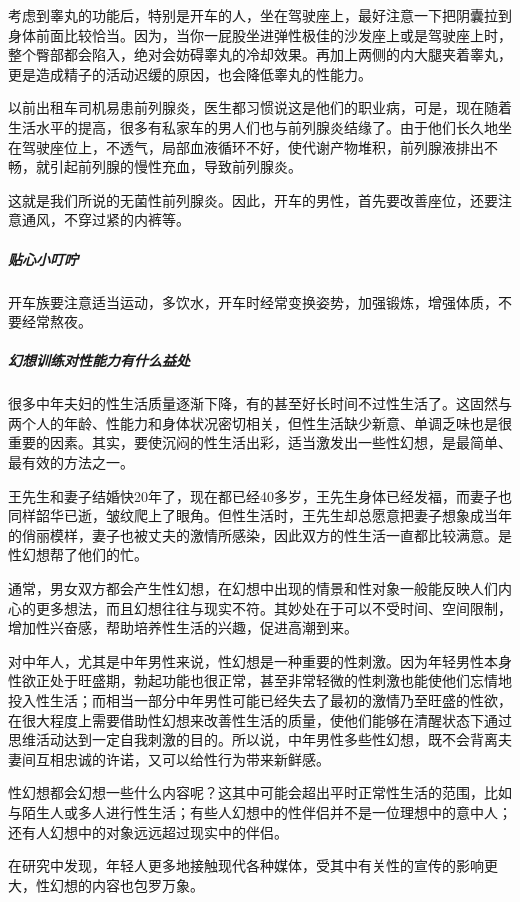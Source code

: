 \begin{enumerate}
考虑到睾丸的功能后，特别是开车的人，坐在驾驶座上，最好注意一下把阴囊拉到身体前面比较恰当。因为，当你一屁股坐进弹性极佳的沙发座上或是驾驶座上时，整个臀部都会陷入，绝对会妨碍睾丸的冷却效果。再加上两侧的内大腿夹着睾丸，更是造成精子的活动迟缓的原因，也会降低睾丸的性能力。

以前出租车司机易患前列腺炎，医生都习惯说这是他们的职业病，可是，现在随着生活水平的提高，很多有私家车的男人们也与前列腺炎结缘了。由于他们长久地坐在驾驶座位上，不透气，局部血液循环不好，使代谢产物堆积，前列腺液排出不畅，就引起前列腺的慢性充血，导致前列腺炎。

这就是我们所说的无菌性前列腺炎。因此，开车的男性，首先要改善座位，还要注意通风，不穿过紧的内裤等。

\subparagraph{贴心小叮咛}

开车族要注意适当运动，多饮水，开车时经常变换姿势，加强锻炼，增强体质，不要经常熬夜。

\subparagraph{幻想训练对性能力有什么益处}

很多中年夫妇的性生活质量逐渐下降，有的甚至好长时间不过性生活了。这固然与两个人的年龄、性能力和身体状况密切相关，但性生活缺少新意、单调乏味也是很重要的因素。其实，要使沉闷的性生活出彩，适当激发出一些性幻想，是最简单、最有效的方法之一。

王先生和妻子结婚快20年了，现在都已经40多岁，王先生身体已经发福，而妻子也同样韶华已逝，皱纹爬上了眼角。但性生活时，王先生却总愿意把妻子想象成当年的俏丽模样，妻子也被丈夫的激情所感染，因此双方的性生活一直都比较满意。是性幻想帮了他们的忙。

通常，男女双方都会产生性幻想，在幻想中出现的情景和性对象一般能反映人们内心的更多想法，而且幻想往往与现实不符。其妙处在于可以不受时间、空间限制，增加性兴奋感，帮助培养性生活的兴趣，促进高潮到来。

对中年人，尤其是中年男性来说，性幻想是一种重要的性刺激。因为年轻男性本身性欲正处于旺盛期，勃起功能也很正常，甚至非常轻微的性刺激也能使他们忘情地投入性生活；而相当一部分中年男性可能已经失去了最初的激情乃至旺盛的性欲，在很大程度上需要借助性幻想来改善性生活的质量，使他们能够在清醒状态下通过思维活动达到一定自我刺激的目的。所以说，中年男性多些性幻想，既不会背离夫妻间互相忠诚的许诺，又可以给性行为带来新鲜感。

性幻想都会幻想一些什么内容呢？这其中可能会超出平时正常性生活的范围，比如与陌生人或多人进行性生活；有些人幻想中的性伴侣并不是一位理想中的意中人；还有人幻想中的对象远远超过现实中的伴侣。

在研究中发现，年轻人更多地接触现代各种媒体，受其中有关性的宣传的影响更大，性幻想的内容也包罗万象。


\end{enumerate}
